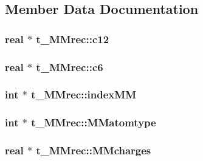\subsection{\-Member \-Data \-Documentation}
\hypertarget{structt__MMrec_aebf029e648231762c6362ee995f2290c}{
\subsubsection[{c12}]{\setlength{\rightskip}{0pt plus 5cm}real $\ast$ {\bf t\-\_\-\-M\-Mrec\-::c12}}}\label{structt__MMrec_aebf029e648231762c6362ee995f2290c}
\hypertarget{structt__MMrec_a82f809edd38e1413e62f5cf8da999da8}{
\subsubsection[{c6}]{\setlength{\rightskip}{0pt plus 5cm}real $\ast$ {\bf t\-\_\-\-M\-Mrec\-::c6}}}\label{structt__MMrec_a82f809edd38e1413e62f5cf8da999da8}
\hypertarget{structt__MMrec_a6a123f34e483ea9181e8be494eb63151}{
\subsubsection[{index\-M\-M}]{\setlength{\rightskip}{0pt plus 5cm}int $\ast$ {\bf t\-\_\-\-M\-Mrec\-::index\-M\-M}}}\label{structt__MMrec_a6a123f34e483ea9181e8be494eb63151}
\hypertarget{structt__MMrec_a1f7240711799769238ddb66fd7447b44}{
\subsubsection[{\-M\-Matomtype}]{\setlength{\rightskip}{0pt plus 5cm}int $\ast$ {\bf t\-\_\-\-M\-Mrec\-::\-M\-Matomtype}}}\label{structt__MMrec_a1f7240711799769238ddb66fd7447b44}
\hypertarget{structt__MMrec_a74a7f42f73e3abd49fc6acbc4e1381bc}{
\subsubsection[{\-M\-Mcharges}]{\setlength{\rightskip}{0pt plus 5cm}real $\ast$ {\bf t\-\_\-\-M\-Mrec\-::\-M\-Mcharges}}}\label{structt__MMrec_a74a7f42f73e3abd49fc6acbc4e1381bc}
